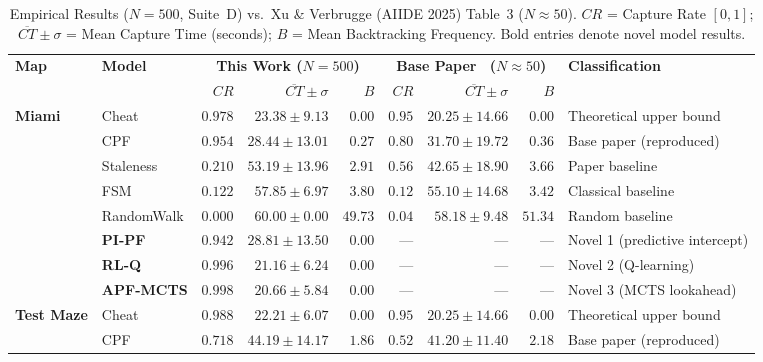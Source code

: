 \documentclass[conference,onecolumn]{IEEEtran}
\begin{document}
\begin{table}[!t]
\caption{Empirical Results ($N{=}500$, Suite~D) vs.\ Xu \& Verbrugge
(AIIDE 2025) Table~3 ($N{\approx}50$). $CR$ = Capture Rate
$[0,1]$; $\overline{CT}\pm\sigma$ = Mean Capture Time (seconds);
$B$ = Mean Backtracking Frequency. Bold entries denote
novel model results.}
\label{tab:main}
\centering
\renewcommand{\arraystretch}{1.25}
\begin{tabular}{l l r r r r r r l}
\toprule
\multirow{2}{*}{\textbf{Map}} &
\multirow{2}{*}{\textbf{Model}} &
\multicolumn{3}{c}{\textbf{This Work ($N{=}500$)}} &
\multicolumn{3}{c}{\textbf{Base Paper~\cite{xu2025} ($N{\approx}50$)}} &
\multirow{2}{*}{\textbf{Classification}} \\
\cmidrule(lr){3-5} \cmidrule(lr){6-8}
& & $CR$ & $\overline{CT}\pm\sigma$ & $B$
  & $CR$ & $\overline{CT}\pm\sigma$ & $B$ & \\
\midrule
\multirow{8}{*}{\textbf{Miami}}
 & Cheat
   & $0.978$ & $23.38\pm9.13$  & $0.00$
   & $0.95$  & $20.25\pm14.66$ & $0.00$ & Theoretical upper bound \\
 & CPF
   & $0.954$ & $28.44\pm13.01$ & $0.27$
   & $0.80$  & $31.70\pm19.72$ & $0.36$ & Base paper (reproduced) \\
 & Staleness
   & $0.210$ & $53.19\pm13.96$ & $2.91$
   & $0.56$  & $42.65\pm18.90$ & $3.66$ & Paper baseline \\
 & FSM
   & $0.122$ & $57.85\pm6.97$  & $3.80$
   & $0.12$  & $55.10\pm14.68$ & $3.42$ & Classical baseline \\
 & RandomWalk
   & $0.000$ & $60.00\pm0.00$  & $49.73$
   & $0.04$  & $58.18\pm9.48$  & $51.34$& Random baseline \\
 & \textbf{PI-PF}
   & $\mathbf{0.942}$ & $\mathbf{28.81\pm13.50}$ & $\mathbf{0.00}$
   & --- & --- & --- & Novel 1 (predictive intercept) \\
 & \textbf{RL-Q}
   & $\mathbf{0.996}$ & $\mathbf{21.16\pm6.24}$  & $\mathbf{0.00}$
   & --- & --- & --- & Novel 2 (Q-learning) \\
 & \textbf{APF-MCTS}
   & $\mathbf{0.998}$ & $\mathbf{20.66\pm5.84}$  & $\mathbf{0.00}$
   & --- & --- & --- & Novel 3 (MCTS lookahead) \\
\midrule
\multirow{8}{*}{\textbf{Test Maze}}
 & Cheat
   & $0.988$ & $22.21\pm6.07$  & $0.00$
   & $0.95$  & $20.25\pm14.66$ & $0.00$ & Theoretical upper bound \\
 & CPF
   & $0.718$ & $44.19\pm14.17$ & $1.86$
   & $0.52$  & $41.20\pm11.40$ & $2.18$ & Base paper (reproduced) \\

\end{tabular}
\end{table}
\end{document}
